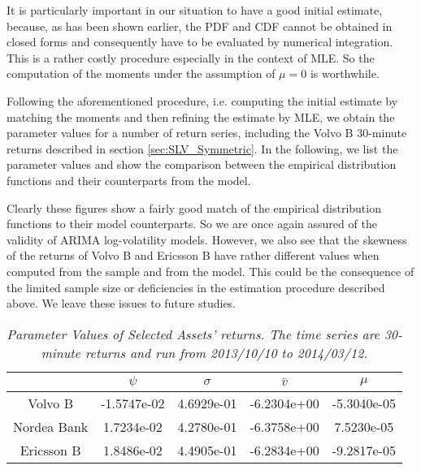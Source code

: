 It is particularly important in our situation to have a good initial
estimate, because, as has been shown earlier, the PDF and CDF cannot
be obtained in closed forms and consequently have to be evaluated by
numerical integration. This is a rather costly procedure especially in
the context of MLE. So the computation of the moments under the
assumption of $\mu = 0$ is worthwhile.

Following the aforementioned procedure, i.e. computing the initial
estimate by matching the moments and then refining the estimate by
MLE, we obtain the parameter values for a number of return series,
including the Volvo B 30-minute returns described in
section \ref{sec:SLV_Symmetric}. In the following, we list the parameter
values and show the comparison between the empirical distribution
functions and their counterparts from the model.

Clearly these figures show a fairly good match of the empirical
distribution functions to their model counterparts. So we are once
again assured of the validity of ARIMA log-volatility models. However,
we also see that the skewness of the returns of Volvo B and Ericsson B
have rather different values when computed from the sample and from
the model. This could be the consequence of the limited sample size or
deficiencies in the estimation procedure described above. We leave
these issues to future studies.


\begin{table}[htb!]
  \centering
  \begin{tabular}{|c|c|c|c|c|}
    \hline
    & $\psi$ & $\sigma$ & $\bar{v}$ & $\mu$ \\
    \hline
    Volvo B & -1.5747e-02 & 4.6929e-01 & -6.2304e+00 &
    -5.3040e-05 \\
    Nordea Bank & 1.7234e-02 & 4.2780e-01 & -6.3758e+00 & 7.5230e-05
    \\
    Ericsson B & 1.8486e-02 & 4.4905e-01 & -6.2834e+00 & -9.2817e-05 \\
    \hline
  \end{tabular}
  \caption{\small \it Parameter Values of Selected Assets'
    returns. The time series are 30-minute returns and run from
    2013/10/10 to 2014/03/12.}
  \label{tab:assets_params}
\end{table}


